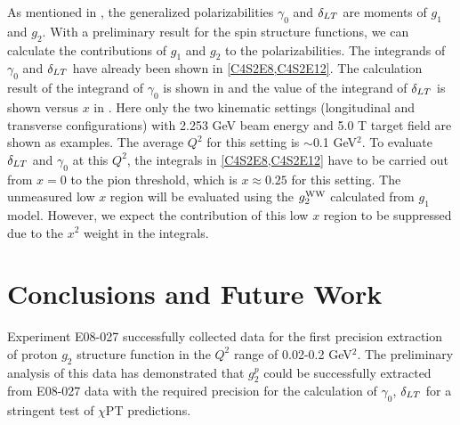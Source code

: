 
As mentioned in , the generalized polarizabilities $\gamma_0$ and $\delta_{LT}$ are moments of $g_1$ and $g_2$. With a preliminary result for the spin structure functions, we can calculate the contributions of $g_1$ and $g_2$ to the polarizabilities. The integrands of $\gamma_0$ and $\delta_{LT}$ have already been shown in \cref{C4S2E8,C4S2E12}. The calculation result of the integrand of $\gamma_0$ is shown in  and the value of the integrand of $\delta_{LT}$ is shown versus $x$ in . Here only the two kinematic settings (longitudinal and transverse configurations) with 2.253 GeV beam energy and 5.0 T target field are shown as examples. The average $Q^2$ for this setting is $\sim$0.1 GeV${}^2$. To evaluate $\delta_{LT}$ and $\gamma_0$ at this $Q^2$, the integrals in \cref{C4S2E8,C4S2E12} have to be carried out from $x=0$ to the pion threshold, which is $x\approx0.25$ for this setting. The unmeasured low $x$ region will be evaluated using the $g_2^{\mathrm{WW}}$ calculated from $g_1$ model. However, we expect the contribution of this low $x$ region to be suppressed due to the $x^2$ weight in the integrals.


\section{Conclusions and Future Work}
\label{C8S6}

Experiment E08-027 successfully collected data for the first precision extraction of proton $g_2$ structure function in the $Q^2$ range of 0.02-0.2 GeV${}^2$. The preliminary analysis of this data has demonstrated that $g_2^p$ could be successfully extracted from E08-027 data with the required precision for the calculation of $\gamma_0$, $\delta_{LT}$ for a stringent test of $\chi$PT predictions.

